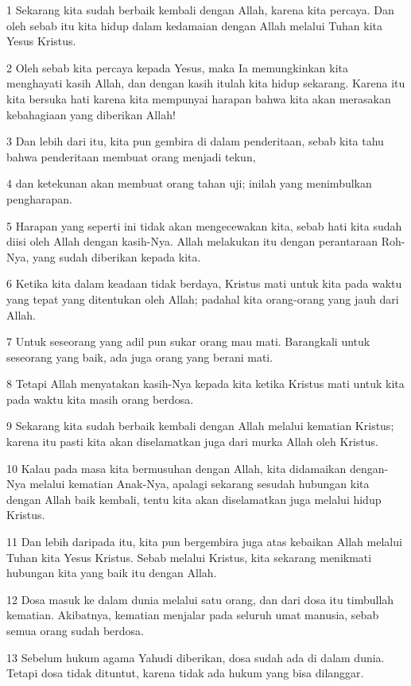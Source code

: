 \par 1 Sekarang kita sudah berbaik kembali dengan Allah, karena kita percaya. Dan oleh sebab itu kita hidup dalam kedamaian dengan Allah melalui Tuhan kita Yesus Kristus.
\par 2 Oleh sebab kita percaya kepada Yesus, maka Ia memungkinkan kita menghayati kasih Allah, dan dengan kasih itulah kita hidup sekarang. Karena itu kita bersuka hati karena kita mempunyai harapan bahwa kita akan merasakan kebahagiaan yang diberikan Allah!
\par 3 Dan lebih dari itu, kita pun gembira di dalam penderitaan, sebab kita tahu bahwa penderitaan membuat orang menjadi tekun,
\par 4 dan ketekunan akan membuat orang tahan uji; inilah yang menimbulkan pengharapan.
\par 5 Harapan yang seperti ini tidak akan mengecewakan kita, sebab hati kita sudah diisi oleh Allah dengan kasih-Nya. Allah melakukan itu dengan perantaraan Roh-Nya, yang sudah diberikan kepada kita.
\par 6 Ketika kita dalam keadaan tidak berdaya, Kristus mati untuk kita pada waktu yang tepat yang ditentukan oleh Allah; padahal kita orang-orang yang jauh dari Allah.
\par 7 Untuk seseorang yang adil pun sukar orang mau mati. Barangkali untuk seseorang yang baik, ada juga orang yang berani mati.
\par 8 Tetapi Allah menyatakan kasih-Nya kepada kita ketika Kristus mati untuk kita pada waktu kita masih orang berdosa.
\par 9 Sekarang kita sudah berbaik kembali dengan Allah melalui kematian Kristus; karena itu pasti kita akan diselamatkan juga dari murka Allah oleh Kristus.
\par 10 Kalau pada masa kita bermusuhan dengan Allah, kita didamaikan dengan-Nya melalui kematian Anak-Nya, apalagi sekarang sesudah hubungan kita dengan Allah baik kembali, tentu kita akan diselamatkan juga melalui hidup Kristus.
\par 11 Dan lebih daripada itu, kita pun bergembira juga atas kebaikan Allah melalui Tuhan kita Yesus Kristus. Sebab melalui Kristus, kita sekarang menikmati hubungan kita yang baik itu dengan Allah.
\par 12 Dosa masuk ke dalam dunia melalui satu orang, dan dari dosa itu timbullah kematian. Akibatnya, kematian menjalar pada seluruh umat manusia, sebab semua orang sudah berdosa.
\par 13 Sebelum hukum agama Yahudi diberikan, dosa sudah ada di dalam dunia. Tetapi dosa tidak dituntut, karena tidak ada hukum yang bisa dilanggar.
